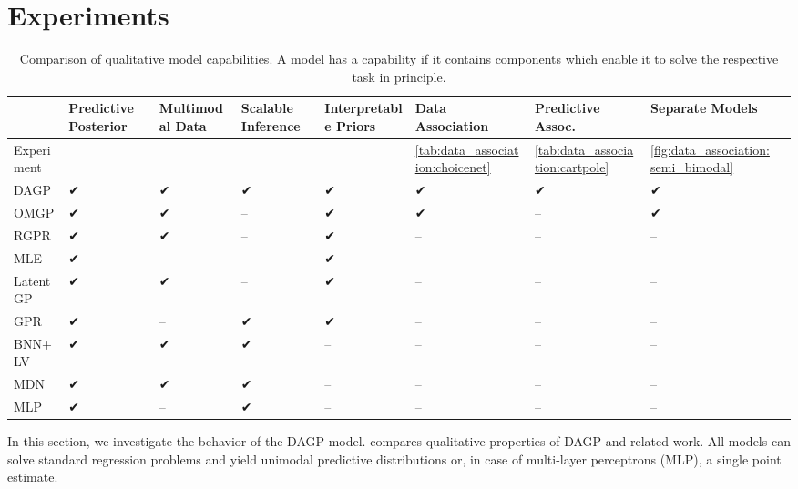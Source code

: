 \section{Experiments}
\label{toc:data_association:experiments}
\begin{table}[t]
    \centering
    \caption[Comparison of DAGP to similar models]{
        \label{tab:data_association:model_capabilities}
        Comparison of qualitative model capabilities.
        A model has a capability if it contains components which enable it to solve the respective task in principle.
    }
    \scriptsize
    \newcommand{\yes}{✔}
    \newcommand{\no}{--}
    \newcommand{\resultrow}[9]{#1 & #4 & #7 & #3 & #9 & #5 & #6 & #8 \\}
    \begin{tabularx}{\linewidth}{lYYYYYYYY}
        \toprule
        \resultrow{}{Bayesian}{Scalable Inference}{Predictive Posterior}{Data Association}{Predictive Assoc.}{Multimodal Data}{Separate Models}{Interpretable Priors}
        \midrule
        Experiment &  &  &  &  & \cref{tab:data_association:choicenet} & \cref{tab:data_association:cartpole} & \cref{fig:data_association:semi_bimodal} \\
        \midrule
        \resultrow{DAGP}{\yes}{\yes}{\yes}{\yes}{\yes}{\yes}{\yes}{\yes}
        \addlinespace
        \resultrow{OMGP \parencite{lazaro-gredilla_overlapping_2012}}{\yes}{\no}{\yes}{\yes}{\no}{\yes}{\yes}{\yes}
        \resultrow{RGPR \parencite{rasmussen_infinite_2002}}{\yes}{\no}{\yes}{\no}{\no}{\yes}{\no}{\yes}
        \resultrow{MLE \parencite{tresp_mixtures_2001}}{\yes}{\no}{\yes}{\no}{\no}{\no}{\no}{\yes}
        \resultrow{LatentGP \parencite{bodin_latent_2017}}{\yes}{\no}{\yes}{\no}{\no}{\yes}{\no}{\yes}
        \resultrow{GPR \parencite{rasmussen_gaussian_2006}}{\yes}{\yes}{\yes}{\no}{\no}{\no}{\no}{\yes}
        \addlinespace
        \resultrow{BNN+LV \parencite{depeweg_learning_2016}}{\yes}{\yes}{\yes}{\no}{\no}{\yes}{\no}{\no}
        \resultrow{MDN \parencite{bishop_mixture_1994}}{\no}{\yes}{\yes}{\no}{\no}{\yes}{\no}{\no}
        \resultrow{MLP}{\no}{\yes}{\yes}{\no}{\no}{\no}{\no}{\no}
        \bottomrule
    \end{tabularx}
\end{table}
In this section, we investigate the behavior of the DAGP model.
 compares qualitative properties of DAGP and related work.
All models can solve standard regression problems and yield unimodal predictive distributions or, in case of multi-layer perceptrons (MLP), a single point estimate.
